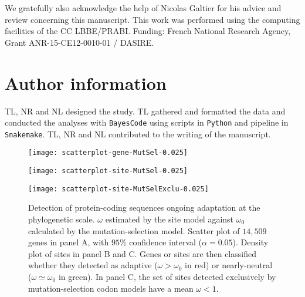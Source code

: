 \documentclass{article}
\begin{document}
    We gratefully also acknowledge the help of Nicolas Galtier for his advice and review concerning this manuscript.
    This work was performed using the computing facilities of the CC LBBE/PRABI.
    Funding: French National Research Agency, Grant ANR-15-CE12-0010-01 / DASIRE.


    \section{Author information}\label{sec:author-information}
    TL, NR and NL designed the study.
    TL gathered and formatted the data and conducted the analyses with \texttt{BayesCode} using scripts in \texttt{Python} and pipeline in \texttt{Snakemake}.
    TL, NR and NL contributed to the writing of the manuscript.

    \printbibliography

    \begin{figure*}[!ht]
        \centering
        \begin{minipage}{0.32\linewidth}
            \texttt{[image: scatterplot-gene-MutSel-0.025]}
        \end{minipage}
        \hfill
        \begin{minipage}{0.32\linewidth}
            \texttt{[image: scatterplot-site-MutSel-0.025]}
        \end{minipage}
        \hfill
        \begin{minipage}{0.32\linewidth}
            \texttt{[image: scatterplot-site-MutSelExclu-0.025]}
        \end{minipage}
        \hfill
        \caption{
            Detection of protein-coding sequences ongoing adaptation at the phylogenetic scale.
            $\omega$ estimated by the site model against $\omega_{0}$ calculated by the mutation-selection model.
            Scatter plot of $14,509$ genes in panel A, with $95$\% confidence interval ($\alpha=0.05$).
            Density plot of sites in panel B and C.
            Genes or sites are then classified whether they detected as adaptive ($\omega > \omega_{0}$ in red) or nearly-neutral ($\omega \simeq \omega_{0}$ in green).
            In panel C, the set of sites detected exclusively by mutation-selection codon models have a mean $\omega < 1 $.}
        \label{fig:scatterplot}
    \end{figure*}
\end{document}
